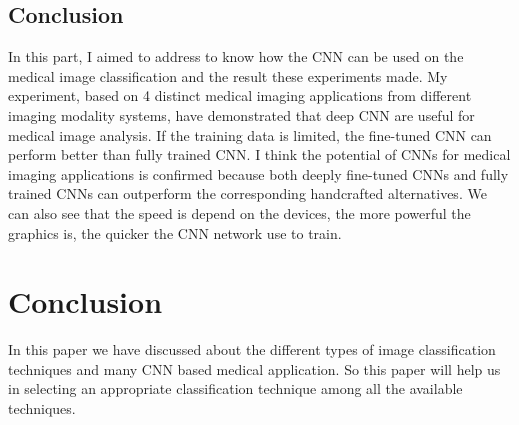 \documentclass[10pt,twocolumn,letterpaper]{article}
\begin{document}
\subsection{Conclusion}

In this part, I aimed to address to know how the CNN can be used on the medical image classification and the result these experiments made. My experiment, based on 4 distinct medical imaging applications from different imaging modality systems, have demonstrated that deep CNN are useful for medical image analysis. If the training data is limited, the fine-tuned CNN can perform better than fully trained CNN. I think the potential of CNNs for medical imaging applications is confirmed because both deeply fine-tuned CNNs and fully trained CNNs can outperform the corresponding handcrafted alternatives. We can also see that the speed is depend on the devices, the more powerful the graphics is, the quicker the CNN network use to train.

\section{Conclusion}

In this paper we have discussed about the different types of image classification techniques and many CNN based medical application. So this paper will help us in selecting an appropriate classification technique among all the available techniques.


\newpage
{\small


}
\end{document}
